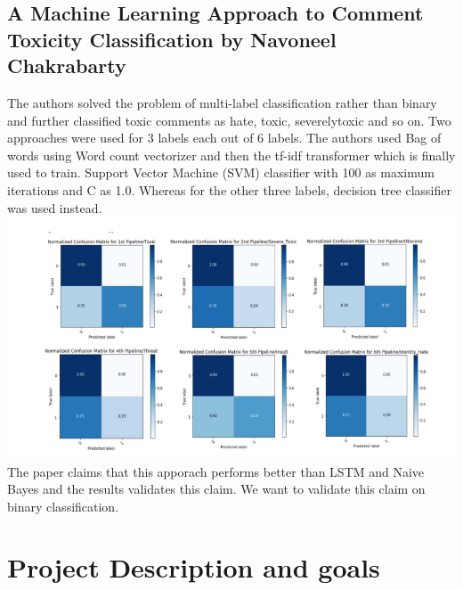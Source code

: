 \documentclass[11pt]{article}
\begin{document}
\subsection{A Machine Learning Approach to Comment Toxicity Classification by Navoneel Chakrabarty}
The authors solved the problem of multi-label classification rather than binary and further classified toxic comments as hate, toxic, severelytoxic and so on. Two approaches were used for 3 labels each out of 6 labels. The authors used Bag of words using Word count vectorizer and then the tf-idf transformer which is finally used to train. Support Vector Machine (SVM) classifier with 100 as maximum iterations and C as 1.0. Whereas for the other three labels, decision tree classifier was used instead.
\includegraphics[scale=0.9]{figs/chakra_all.png}
The paper claims that this apporach performs better than LSTM and Naive Bayes and the results validates this claim. We want to validate this claim on binary classification.
\section{Project Description and goals}
\end{document}
